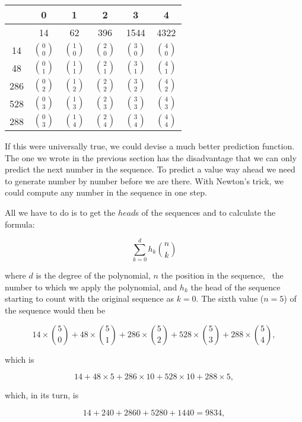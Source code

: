 \documentclass[tikz]{scrreprt}
\newcommand{\Varid}[1]{\mathit{#1}}
\begin{document}
\begin{center}
\begingroup
\renewcommand{\arraystretch}{1.5}
\begin{tabular}{||c||c|c|c|c|c||}
\hline
     &  0 &  1  &  2  &  3   &  4   \\\hline
     & 14         & 62         & 396        & 1544       & 4322       \\\hline\hline
  14 &$\binom{0}{0}$&$\binom{1}{0}$&$\binom{2}{0}$&$\binom{3}{0}$&$\binom{4}{0}$\\\hline
  48 &$\binom{0}{1}$&$\binom{1}{1}$&$\binom{2}{1}$&$\binom{3}{1}$&$\binom{4}{1}$\\\hline
 286 &$\binom{0}{2}$&$\binom{1}{2}$&$\binom{2}{2}$&$\binom{3}{2}$&$\binom{4}{2}$\\\hline
 528 &$\binom{0}{3}$&$\binom{1}{3}$&$\binom{2}{3}$&$\binom{3}{3}$&$\binom{4}{3}$\\\hline
 288 &$\binom{0}{3}$&$\binom{1}{4}$&$\binom{2}{4}$&$\binom{3}{4}$&$\binom{4}{4}$\\\hline
\end{tabular}
\endgroup
\end{center}

If this were universally true, we could devise a 
much better prediction function. The one we wrote
in the previous section has the disadvantage
that we can only predict the next number in the sequence.
To predict a value way ahead we need to generate
number by number before we are there.
With Newton's trick, we could compute any number
in the sequence in one step.

All we have to do is to get the \ensuremath{\Varid{head}}s of the sequences
and to calculate the formula:

\[
\sum_{k=0}^{d}{h_k\binom{n}{k}} 
\]

where $d$ is the degree of the polynomial, $n$
the position in the sequence, \ie\ the number
to which we apply the polynomial, and $h_k$
the head of the sequence starting to count
with the original sequence as $k=0$.
The sixth value ($n=5$) of the sequence would then be

\[
  14 \times \binom{5}{0} + 
  48 \times \binom{5}{1} + 
 286 \times \binom{5}{2} + 
 528 \times \binom{5}{3} + 
 288 \times \binom{5}{4}, 
\]

which is

\[
  14           + 
  48 \times  5 + 
 286 \times 10 + 
 528 \times 10 + 
 288 \times  5, 
\]

which, in its turn, is

\[
14 + 240 + 2860 + 5280 + 1440 = 9834,
\]
\end{document}
